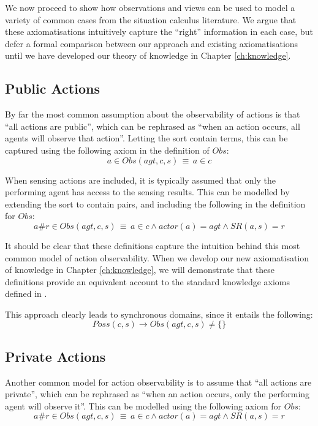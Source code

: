 We now proceed to show how observations and views can be used to model
a variety of common cases from the situation calculus literature.
We argue that these axiomatisations intuitively capture the {}``right''
information in each case, but defer a formal comparison between our
approach and existing axiomatisations until we have developed our
theory of knowledge in Chapter \ref{ch:knowledge}.


\subsection{Public Actions}

By far the most common assumption about the observability of actions
is that {}``all actions are public'', which can be rephrased as
{}``when an action occurs, all agents will observe that action''.
Letting the sort contain terms, this
can be captured using the following axiom in the definition of $Obs$:\begin{equation}
a\in Obs(agt,c,s)\,\equiv\, a\in c\label{eq:Observations:ObsStd1}\end{equation}


When sensing actions are included, it is typically assumed that only
the performing agent has access to the sensing results. This can be
modelled by extending the  sort to contain 
pairs, and including the following in the definition for $Obs$:\begin{equation}
a\#r\in Obs(agt,c,s)\,\equiv\, a\in c\wedge actor(a)=agt\wedge SR(a,s)=r\label{eq:Observations:ObsStd2}\end{equation}


It should be clear that these definitions capture the intuition behind
this most common model of action observability. When we develop our
new axiomatisation of knowledge in Chapter \ref{ch:knowledge}, we
will demonstrate that these definitions provide an equivalent account
to the standard knowledge axioms defined in \citep{scherl03sc_knowledge}.

This approach clearly leads to synchronous domains, since it entails
the following:\[
Poss(c,s)\rightarrow Obs(agt,c,s)\neq\{\}\]



\subsection{Private Actions}

Another common model for action observability is to assume that {}``all
actions are private'', which can be rephrased as {}``when an action
occurs, only the performing agent will observe it''. This can be
modelled using the following axiom for $Obs$:\[
a\#r\in Obs(agt,c,s)\,\equiv\, a\in c\wedge actor(a)=agt\wedge SR(a,s)=r\]



